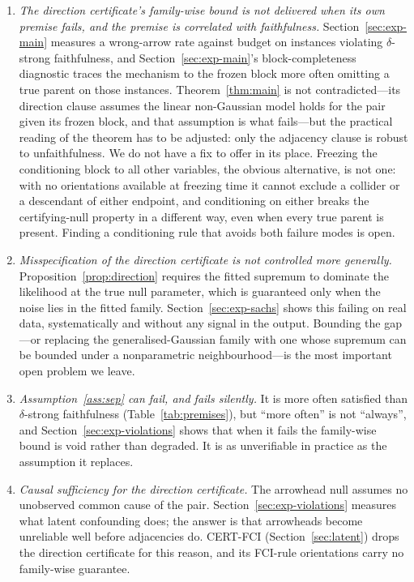 \documentclass[pdflatex,sn-apa]{sn-jnl}
\theoremstyle{thmstyleone}%
\theoremstyle{thmstyletwo}%
\theoremstyle{thmstylethree}%
\begin{document}
\begin{enumerate}
\item \emph{The direction certificate's family-wise bound is not delivered
  when its own premise fails, and the premise is correlated with
  faithfulness.} Section~\ref{sec:exp-main} measures a wrong-arrow rate
  against budget on instances violating $\delta$-strong faithfulness, and
  Section~\ref{sec:exp-main}'s block-completeness diagnostic traces the
  mechanism to the frozen block more often omitting a true parent on those
  instances. Theorem~\ref{thm:main} is not contradicted---its direction
  clause assumes the linear non-Gaussian model holds for the pair given its
  frozen block, and that assumption is what fails---but the practical reading
  of the theorem has to be adjusted: only the adjacency clause is robust to
  unfaithfulness. We do not have a fix to offer in its place. Freezing the
  conditioning block to all other variables, the obvious alternative, is not
  one: with no orientations available at freezing time it cannot exclude a
  collider or a descendant of either endpoint, and conditioning on either
  breaks the certifying-null property in a different way, even when every
  true parent is present. Finding a conditioning rule that avoids both
  failure modes is open.

\item \emph{Misspecification of the direction certificate is not controlled
  more generally.} Proposition~\ref{prop:direction} requires the fitted
  supremum to dominate the likelihood at the true null parameter, which is
  guaranteed only when the noise lies in the fitted family.
  Section~\ref{sec:exp-sachs} shows this failing on real data,
  systematically and without any signal in the output. Bounding the gap---or
  replacing the generalised-Gaussian family with one whose supremum can be
  bounded under a nonparametric neighbourhood---is the most important open
  problem we leave.

\item \emph{Assumption~\ref{ass:sep} can fail, and fails silently.} It is more
  often satisfied than $\delta$-strong faithfulness
  (Table~\ref{tab:premises}), but ``more often'' is not ``always'', and
  Section~\ref{sec:exp-violations} shows that when it fails the family-wise
  bound is void rather than degraded. It is as unverifiable in practice as the
  assumption it replaces.

\item \emph{Causal sufficiency for the direction certificate.} The arrowhead
  null assumes no unobserved common cause of the pair.
  Section~\ref{sec:exp-violations} measures what latent confounding does; the
  answer is that arrowheads become unreliable well before adjacencies do.
  CERT-FCI (Section~\ref{sec:latent}) drops the direction certificate for this
  reason, and its FCI-rule orientations carry no family-wise guarantee.


\end{enumerate}
\end{document}
